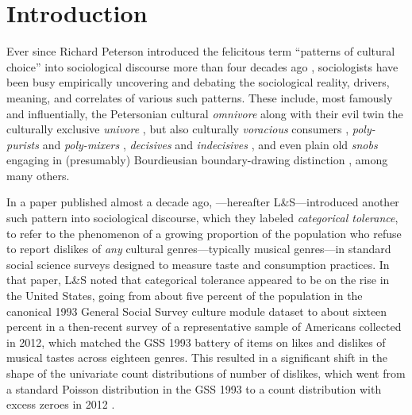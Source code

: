 \documentclass[12pt]{article}
\begin{document}
\section*{Introduction}
Ever since Richard Peterson introduced the felicitous term ``patterns of cultural choice'' into sociological discourse more than four decades ago \citep{peterson1983patterns-f85}, sociologists have been busy empirically uncovering and debating the sociological reality, drivers, meaning, and correlates of various such patterns. These include, most famously and influentially, the Petersonian cultural \textit{omnivore} \citep{peterson1996changing-967, goldberg2011mapping-77a, warde2008omnivorous-e77} along with their evil twin the culturally exclusive \textit{univore} \citep{bryson1997what-933, peterson1992understanding-ce3, tonkovi2025globallocal-96f}, but also culturally \textit{voracious} consumers \citep{sullivan2007omnivore-018}, \textit{poly-purists} and \textit{poly-mixers} \citep{goldberg2016what-4e3, poecke2018pure-873}, \textit{decisives} and \textit{indecisives} \citep{sonnett2004musical-961}, and even plain old \textit{snobs} engaging in (presumably) Bourdieusian boundary-drawing distinction \citep{atkinson2011context-d44, nault2021social-1bf}, among many others.

In a paper published almost a decade ago, \citet{lizardo2016end-4fb}---hereafter L\&S---introduced another such pattern into sociological discourse, which they labeled \textit{categorical tolerance}, to refer to the phenomenon of a growing proportion of the population who refuse to report dislikes of \textit{any} cultural genres---typically musical genres---in standard social science surveys designed to measure taste and consumption practices. In that paper, L\&S noted that categorical tolerance appeared to be on the rise in the United States, going from about five percent of the population in the canonical 1993 General Social Survey culture module dataset to about sixteen percent in a then-recent survey of a representative sample of Americans collected in 2012, which matched the GSS 1993 battery of items on likes and dislikes of musical tastes across eighteen genres. This resulted in a significant shift in the shape of the univariate count distributions of number of dislikes, which went from a standard Poisson distribution in the GSS 1993 to a count distribution with excess zeroes in 2012 \citep[p.90, Figure 1]{lizardo2016end-4fb}. 
\end{document}
